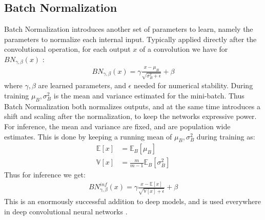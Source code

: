 \subsection{Batch Normalization}
Batch Normalization \cite{ioffeBatchNormalizationAccelerating2015a} introduces another set of parameters to learn, namely the parameters to normalize each internal input.
Typically applied directly after the convolutional operation, for each output $x$ of a convolution we have for $BN_{\gamma,\beta}(x)$
\cite{santurkarHowDoesBatch2019}:
\begin{align}
	BN_{\gamma,\beta}(x) = \gamma \frac{x-\mu_B}{\sqrt{\sigma_B^2 + \epsilon}} + \beta
\end{align}
where $\gamma, \beta$ are learned parameters, and $\epsilon$ needed for numerical stability. 
During training $\mu_B,\sigma_B^2$ is the mean and variance estimated for the mini-batch. 
Thus Batch Normalization both normalizes outputs, and at the same time introduces a shift and scaling after the normalization, to keep the networks expressive power. 
For inference, the mean and variance are fixed, and are population wide estimates.
This is done by keeping a running mean of $\mu_B,\sigma_B^2$ during training as:
\begin{align}
	\mathbb{E}[x] &= \mathbb{E}_B[\mu_B] \\
	\mathbb{V}[x] &= \frac{m}{m-1} \mathbb{E}_B[\sigma_B^2]
\end{align}
Thus for inference we get:
\begin{align}
		BN_{\gamma,\beta}^{inf}(x) = \gamma  \frac{x -\mathbb{E}[x]}{\sqrt{\mathbb{V}[x] + \epsilon}} + \beta
\end{align}
This is an enormously successful addition to deep models, and is used everywhere in deep convolutional neural networks \cite{santurkarHowDoesBatch2019} \cite{frankleTrainingBatchNormOnly2020a}.
